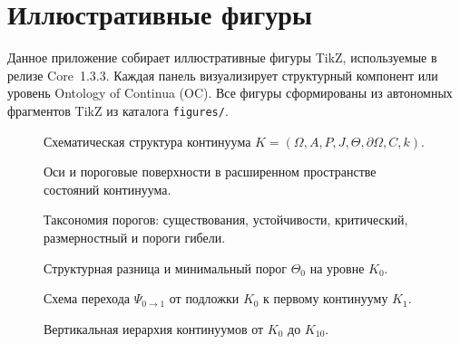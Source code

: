 
\section{Иллюстративные фигуры}
\label{sec:figures}

Данное приложение собирает иллюстративные фигуры TikZ, используемые в релизе Core~1.3.3.
Каждая панель визуализирует структурный компонент или уровень
Ontology of Continua (OC). Все фигуры сформированы из автономных
фрагментов TikZ из каталога \texttt{figures/}.

\begin{figure}[p]
  \centering
  
  \caption{Схематическая структура континуума
           \(K = (\Omega, A, P, J, \Theta, \partial\Omega, C, k)\).}
  \label{fig:continua-structure}
\end{figure}

\begin{figure}[p]
  \centering
  
  \caption{Оси и пороговые поверхности в расширенном пространстве состояний
           континуума.}
  \label{fig:axes-thresholds}
\end{figure}

\begin{figure}[p]
  \centering
  
  \caption{Таксономия порогов: существования, устойчивости,
           критический, размерностный и пороги гибели.}
  \label{fig:thresholds-taxonomy}
\end{figure}

\begin{figure}[p]
  \centering
  
  \caption{Структурная разница и минимальный порог
           \texorpdfstring{\(\Theta_0\)}{\Theta_0} на уровне
           \texorpdfstring{\(K_0\)}{K_0}.}
  \label{fig:delta-threshold-k0}
\end{figure}

\begin{figure}[p]
  \centering
  
  \caption{Схема перехода \(\Psi_{0\to 1}\) от подложки
           \(K_0\) к первому континууму \(K_1\).}
  \label{fig:k0-k1-transition}
\end{figure}

\begin{figure}[p]
  \centering
  
  \caption{Вертикальная иерархия континуумов от
           \texorpdfstring{\(K_0\)}{K_0} до \(K_{10}\).}
  \label{fig:levels-hierarchy}
\end{figure}

